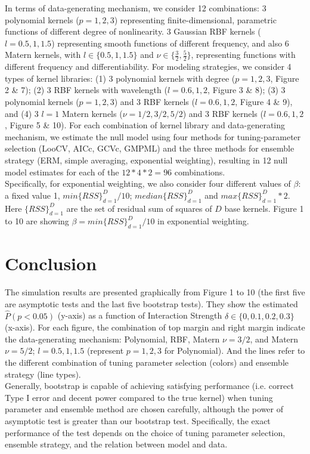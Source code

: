 \documentclass[11pt]{article}
\begin{document}
In terms of data-generating mechanism, we consider 12 combinations: 3 polynomial kernels ($p=1, 2, 3$) representing finite-dimensional, parametric functions of different degree of nonlinearity. 3 Gaussian RBF kernels ($l=0.5, 1, 1.5$) representing smooth functions of different frequency, and also 6 Matern kernels, with $l \in \{0.5, 1, 1.5\}$ and $\nu \in \{\frac{3}{2}, \frac{5}{2}\}$, representing functions with different frequency and differentiability. For modeling strategies, we consider 4 types of kernel libraries: (1) 3 polynomial kernels with degree ($p=1, 2, 3$, Figure 2 \& 7); (2) 3 RBF kernels with wavelength ($l=0.6, 1, 2$, Figure 3 \& 8); (3) 3 polynomial kernels ($p=1, 2, 3$) and 3 RBF kernels ($l=0.6, 1, 2$, Figure 4 \& 9), and (4) 3 $l=1$ Matern kernels ($\nu=1/2, 3/2, 5/2$) and 3 RBF kernels ($l=0.6, 1, 2$, Figure 5 \& 10). For each combination of kernel library and data-generating mechanism, we estimate the null model using four methods for tuning-parameter selection (LooCV, AICc, GCVc, GMPML) and the three methods for ensemble strategy (ERM, simple averaging, exponential weighting), resulting in 12 null model estimates for each of the $12 * 4 * 2 = 96$ combinations.\\

Specifically, for exponential weighting, we also consider four different values of $\beta$: a fixed value 1, $min\{RSS\} _{d=1}^D/10$; $median\{RSS\} _{d=1}^D$ and $max\{RSS\} _{d=1}^D * 2$. Here $\{RSS\} _{d=1}^D$ are the set of residual sum of squares of $D$ base kernels. Figure 1 to 10 are showing $\beta = min\{RSS\} _{d=1}^D/10$ in exponential weighting.


\section{{\bf Conclusion}}
The simulation results are presented graphically from Figure 1 to 10 (the first five are asymptotic tests and the last five bootstrap tests). They show the estimated $\hat{P}(p<0.05)$ (y-axis) as a function of Interaction Strength $\delta \in \{0, 0.1, 0.2, 0.3\}$ (x-axis). For each figure, the combination of top margin and right margin indicate the data-generating mechanism: Polynomial, RBF, Matern $\nu=3/2$, and Matern $\nu=5/2$; $l=0.5, 1, 1.5$ (represent $p=1, 2, 3$ for Polynomial). And the lines refer to the different combination of tuning parameter selection (colors) and ensemble strategy (line types).\\

Generally, bootstrap is capable of achieving satisfying performance (i.e. correct Type I error and decent power compared to the true kernel) when tuning parameter and ensemble method are chosen carefully, although the power of asymptotic test is greater than our bootstrap test. Specifically, the exact performance of the test depends on the choice of tuning parameter selection, ensemble strategy, and the relation between model and data.\\
\end{document}

